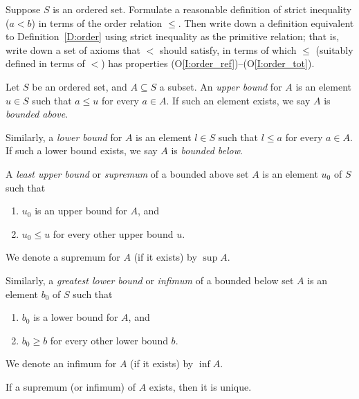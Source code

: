\documentclass{book}
\begin{document}
\begin{prob}
Suppose $S$ is an ordered set. Formulate a reasonable definition of strict
inequality ($a < b$) in terms of the order relation $\leq$.  Then write
down a definition equivalent to Definition~\ref{D:order} using strict
inequality as the primitive relation; that is, write down a set of axioms that $<$
should satisfy, in terms of which $\leq$ (suitably defined in terms of $<$) has properties (O\ref{I:order_ref})--(O\ref{I:order_tot}).
\label{Pr:equiv_order}
\end{prob}

\begin{defn}
Let $S$ be an ordered set, and $A \subseteq S$ a subset. An {\em upper bound} for $A$ is an element $u \in S$
such that $a \leq u$ for every $a \in A$. If such an element exists, we say $A$ is {\em bounded above}. 

Similarly, a {\em lower bound} for $A$ is an element $l \in S$ such that $l \leq a$ for every $a \in A$. If such a lower bound
exists, we say $A$ is {\em bounded below}. 
\label{D:bounded_above_below}
\end{defn}

\begin{defn}
A {\em least upper bound} or {\em supremum} of a bounded above set $A$ is an element $u_0$ of $S$ such that
\begin{enumerate}
\item 
$u_0$ is an upper bound for $A$, and
\item
$u_0 \leq u$ for every other upper bound $u$.
\end{enumerate}
We denote a supremum for $A$ (if it exists) by $\sup A$.

Similarly, a {\em greatest lower bound} or {\em infimum} of a bounded below set $A$ is an element $b_0$ of $S$ such that
\begin{enumerate}
\item 
$b_0$ is a lower bound for $A$, and
\item
$b_0 \geq b$ for every other lower bound $b$.
\end{enumerate}
We denote an infimum for $A$ (if it exists) by $\inf A$.
\label{D:inf_sup}
\end{defn}

\begin{prop}
If a supremum (or infimum) of $A$ exists, then it is unique.
\label{P:unique_sup}
\end{prop}
\end{document}
